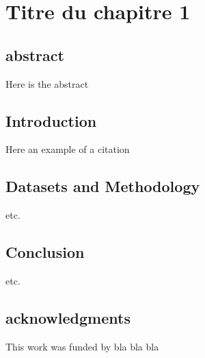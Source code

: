 \chapter{Titre du chapitre 1}


\section{abstract}

Here is the abstract

\section{Introduction}
\label{sec:intro}

Here an example of a citation \citep{Someauthor2013}

\section{Datasets and Methodology}
\label{sec:method}

etc.

\section{Conclusion}

etc.



\section{acknowledgments}
This work was funded by bla bla bla


%    
%   




